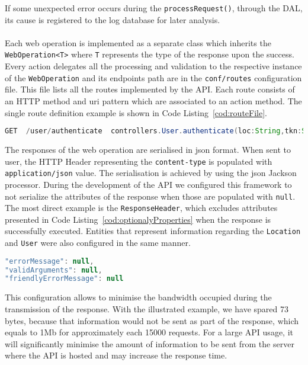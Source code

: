 If some unexpected error occurs during the \verb"processRequest()", through the DAL, its cause is registered to the log database for later analysis.\\
\\
Each web operation is implemented as a separate class which inherits the \verb"WebOperation<T>" where \verb"T" represents the type of the response upon the success. Every action delegates all the processing and validation to the respective instance of the \verb"WebOperation" and its endpoints path are in the \verb"conf/routes" configuration file. This file lists all the routes implemented by the API. Each route consists of an HTTP method and \gls{uri} pattern which are associated to an action method. The single route definition example is shown in Code Listing~\ref{cod:routeFile}.
\newpage
\begin{lstlisting}[language=java,caption={An example of the route file entry.},label={cod:routeFile}, frame=bt]
GET  /user/authenticate  controllers.User.authenticate(loc:String,tkn:String)
\end{lstlisting}
The responses of the web operation are serialised in \gls{json} format. When sent to user, the HTTP Header representing the \verb"content-type" is populated with \verb"application/json" value. The serialisation is achieved by using the  \gls{json} Jackson~\cite{jsonJackson} processor. During the development of the API we configured this framework to not serialize the attributes of the response when those are populated with \verb"null". The most direct example is the \verb"ResponseHeader", which excludes attributes presented in Code Listing~\ref{cod:optionalyProperties} when the response is successfully executed. Entities that represent information regarding the \verb"Location" and \verb"User" were also configured in the same manner.
\begin{lstlisting}[language=java,caption={Optional properties of the ResponseHeader.},label={cod:optionalyProperties}, frame=bt]
"errorMessage": null,
"validArguments": null,
"friendlyErrorMessage": null
\end{lstlisting}
This configuration allows to minimise the bandwidth occupied during the transmission of the response. With the illustrated example, we have spared 73 bytes, because that information would not be sent as part of the response, which equals to 1Mb for approximately each 15000 requests. For a large API usage, it will significantly minimise the amount of information to be sent from the server where the API is hosted and may increase the response time.
